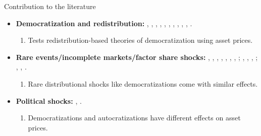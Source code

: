 
\begin{frame}{Contribution to the literature}

	\begin{itemize}	
		\item<1-> {\small \textbf{Democratization and redistribution:} \cite{Tocqueville1835}, \cite{Marx1848}, \cite{Weber1946}, \cite{Lipset1959},  \cite{Luebbert1991}, \cite{Rodrik1999}, \cite{Boix2003}, \cite{Acemoglu2006}, \cite*{Aghion2014}, \cite*{Acemoglu2015,Acemoglu2019}, \cite{Dasgupta2021}.}
		\begin{enumerate}[$\Rightarrow$]
		\item<2-> {\color{red} Tests redistribution-based theories of democratization using asset prices.}		
		\end{enumerate}
		\vspace{.25cm}
		\item<3-> {\small \textbf{Rare events/incomplete markets/factor share shocks:} \cite{Rietz1988}, \cite{Barro2006a}, \cite*{Berkman2011}, \cite{Gabaix2012}, \cite{Julliard2012},  \cite{Wachter2013}, \cite{Manela2017}, \cite{Muir2017}; \cite{Mankiw1986},  \cite{Constantinides1996}, \cite{Constantinides2017}, \cite*{Catherine2021}; \cite{Danthine2002}, \cite*{Lettau2019}, \cite*{Greenwald2022}.}
		\begin{enumerate}[$\Rightarrow$]
		\item<4-> {\color{red} Rare distributional shocks like democratizations come with similar effects.}		
		\end{enumerate}
			\vspace{.25cm}
		\item<5-> {\small \textbf{Political shocks:} \cite*{Pastor2012,Pastor2013,Pastor2016,Pastor2020, Pastor2021},  \cite*{Delis2019}.}
		\begin{enumerate}[$\Rightarrow$]
		\item<6-> {\color{red} Democratizations and autocratizations have different effects on asset prices.}		
		\end{enumerate}
	\end{itemize}
	
\end{frame}
